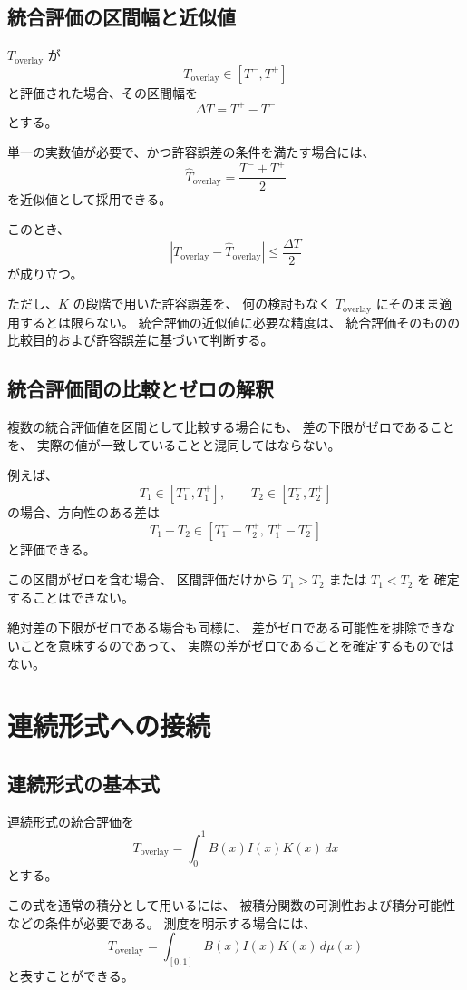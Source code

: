 \documentclass[a4paper,12pt]{article}
\begin{document}
\subsection{統合評価の区間幅と近似値}

$T_{\mathrm{overlay}}$ が
\[
    T_{\mathrm{overlay}}\in[T^-,T^+]
\]
と評価された場合、その区間幅を
\[
    \Delta T=T^+-T^-
\]
とする。

単一の実数値が必要で、かつ許容誤差の条件を満たす場合には、
\[
    \widehat{T}_{\mathrm{overlay}}
    =
    \frac{T^-+T^+}{2}
\]
を近似値として採用できる。

このとき、
\[
    |T_{\mathrm{overlay}}-\widehat{T}_{\mathrm{overlay}}|
    \leq\frac{\Delta T}{2}
\]
が成り立つ。

ただし、$K$ の段階で用いた許容誤差を、
何の検討もなく $T_{\mathrm{overlay}}$ にそのまま適用するとは限らない。
統合評価の近似値に必要な精度は、
統合評価そのものの比較目的および許容誤差に基づいて判断する。

\subsection{統合評価間の比較とゼロの解釈}

複数の統合評価値を区間として比較する場合にも、
差の下限がゼロであることを、
実際の値が一致していることと混同してはならない。

例えば、
\[
    T_1\in[T_1^-,T_1^+],
    \qquad
    T_2\in[T_2^-,T_2^+]
\]
の場合、方向性のある差は
\[
    T_1-T_2
    \in
    [T_1^--T_2^+,\,T_1^+-T_2^-]
\]
と評価できる。

この区間がゼロを含む場合、
区間評価だけから $T_1>T_2$ または $T_1<T_2$ を
確定することはできない。

絶対差の下限がゼロである場合も同様に、
差がゼロである可能性を排除できないことを意味するのであって、
実際の差がゼロであることを確定するものではない。

\section{連続形式への接続}

\subsection{連続形式の基本式}

連続形式の統合評価を
\[
    T_{\mathrm{overlay}}
    =
    \int_0^1 B(x)I(x)K(x)\,dx
\]
とする。

この式を通常の積分として用いるには、
被積分関数の可測性および積分可能性などの条件が必要である。
測度を明示する場合には、
\[
    T_{\mathrm{overlay}}
    =
    \int_{[0,1]}B(x)I(x)K(x)\,d\mu(x)
\]
と表すことができる。
\end{document}
